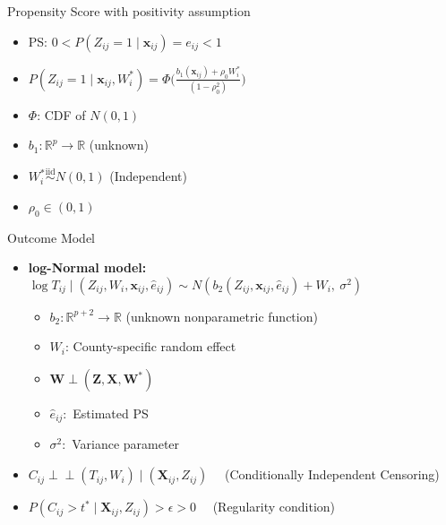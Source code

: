 \documentclass{beamer}
\begin{document}
 



 

\begin{frame}{ Propensity Score with positivity assumption}
\begin{itemize}
   \vfill \item PS: $0<P(Z_{ij}=1\mid   \mathbf{x}_{ij})=e_{ij}<1$
   \vfill \item $
 P(Z_{ij}=1\mid   \mathbf{x}_{ij},W^*_i)
          =\Phi\bigl(\frac{b_1(\mathbf{x}_{ij})+\rho_0 W^*_i}{(1-\rho_0^2)}\bigr)  $ 
          \vfill \item \(\Phi\):  CDF of $N(0,1)$  
          \vfill \item $b_1: \mathbb{R}^{p}\to \mathbb{R}$  (unknown)
          \vfill \item $W^*_i \overset{\mathrm{iid}}{\sim} N(0,1)$ (Independent)
          \vfill \item $\rho_0 \in (0,1)$
        

\end{itemize}

    
\end{frame}
\begin{frame}{Outcome Model}
    \begin{itemize}
         \vfill  \item \textbf{log-Normal model:} \\
       $\log T_{ij} \mid (Z_{ij},W_i,\mathbf{x}_{ij},\hat{e}_{ij}) \sim N (b_2(Z_{ij}, \mathbf{x}_{ij},\hat{e}_{ij}) + W_i,\ \sigma^2)$ 
    

     \begin{itemize}
      
       \vfill \item $b_2: \mathbb{R}^{p+2}\to \mathbb{R}$ (unknown nonparametric function)
       \vfill \item $W_i$: County-specific  random effect 
       \vfill \item $ \mathbf{W}\perp (\mathbf{Z},\mathbf{X},\mathbf{W}^*)$ 
       \vfill \item $\hat{e}_{ij}:$ Estimated PS
       \vfill \item $\sigma^2:$ Variance parameter
     \end{itemize}
   \vfill \item   $C_{ij}\perp\!\!\!\perp (T_{ij}, W_i)  \mid   (\mathbf{X}_{ij},  Z_{ij} ) \quad $ (Conditionally Independent Censoring)
   \vfill \item $P(C_{ij} > t^* \mid \mathbf{X}_{ij}, Z_{ij}) > \epsilon >0 \quad$ (Regularity condition)
   
    \end{itemize}
\end{frame}
\end{document}
